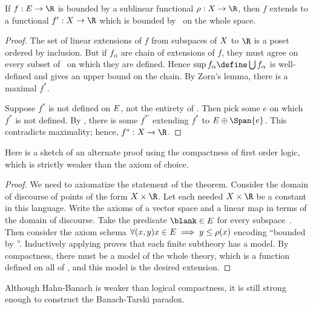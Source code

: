 \documentclass{scrartcl}
\begin{document}
\begin{theorem}
  If \(f:\subspace\to \R\) is bounded by a sublinear functional \(\sublin: \thespace \to \R\), then \(f\) extends to a functional \(f':\thespace\to\R\) which is bounded by \sublin\ on the whole space.
\end{theorem}
\begin{proof}
  The set of linear extensions of \(f\) from subspaces of \(X\) to \(\R\) is a poset ordered by inclusion. But if \(f_\alpha\) are chain of extensions of \(f\), they must agree on every subset of \thespace\ on which they are defined. Hence \(\sup f_\alpha\define \bigcup f_\alpha\) is well-defined and gives an upper bound on the chain. By Zorn's lemma, there is a maximal \(f^*\).

  Suppose \(f^*\) is not defined on \(E\), not the entirety of \thespace. Then pick some \(e\) on which \(f^*\) is not defined. By , there is some \(f^{*\prime}\) extending \(f^*\) to \(\subspace\oplus \Span\{e\}\). This contradicts maximality; hence, \(f^*:\thespace \to \R\).
\end{proof}

Here is a sketch of an alternate proof using the compactness of first order logic, which is strictly weaker than the axiom of choice.
\begin{proof}
  We need to axiomatize the statement of the theorem. Consider the domain of discourse of points of the form \(\thespace \times \R\). Let each needed \(X\times\R\) be a constant in this language. Write the axioms of a vector space and a linear map in terms of the domain of discourse. Take the predicate \(\blank\in \subspace\) for every subspace~\subspace. Then consider the axiom schema \(\forall (x,y) x\in E \implies y \leq \rho(x)\) encoding ``bounded by \sublin''. Inductively applying  proves that each finite subtheory has a model. By compactness, there must be a model of the whole theory, which is a function defined on all of \thespace, and this model is the desired extension.
\end{proof}

Although Hahn-Banach is weaker than logical compactness, it is still strong enough to construct the Banach-Tarski paradox.
\end{document}
